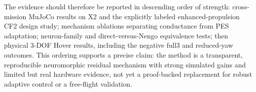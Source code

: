 The evidence should therefore be reported in descending order of strength:
cross-mission MuJoCo results on X2 and the explicitly labeled enhanced-propulsion
CF2 design study; mechanism ablations separating conductance from PES adaptation;
neuron-family and direct-versus-Nengo equivalence tests; then physical 3-DOF Hover
results, including the negative full3 and reduced-yaw outcomes.  This ordering
supports a precise claim: the method is a transparent, reproducible neuromorphic
residual mechanism with strong simulated gains and limited but real hardware
evidence, not yet a proof-backed replacement for robust adaptive control or a
free-flight validation.

